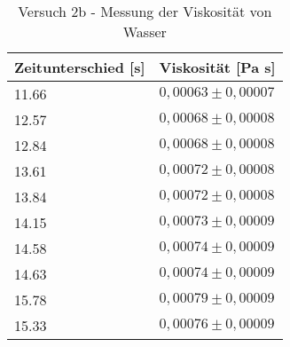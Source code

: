 \begin{table}[!h]
\centering
\begin{tabular}{|l|l|}
 \hline
Zeitunterschied [s] & Viskosität [Pa s]\\
\hline
\num{11,66} & $0,00063 \pm 0,00007$\\
\hline
\num{12,57} & $0,00068 \pm 0,00008$\\
\hline
\num{12,84} & $0,00068 \pm 0,00008$\\
\hline
\num{13,61} & $0,00072 \pm 0,00008$\\
\hline
\num{13,84} & $0,00072 \pm 0,00008$\\
\hline
\num{14,15} & $0,00073 \pm 0,00009$\\
\hline
\num{14,58} & $0,00074 \pm 0,00009$\\
\hline
\num{14,63} & $0,00074 \pm 0,00009$\\
\hline
\num{15,78} & $0,00079 \pm 0,00009$\\
\hline
\num{15,33} & $0,00076 \pm 0,00009$\\

 \hline
\end{tabular}
\caption{Versuch 2b - Messung der Viskosität von Wasser}\label{tbl:visko2b}\end{table}